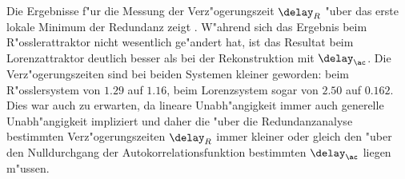 Die Ergebnisse f"ur die Messung der Verz"ogerungszeit $\delay_R$ "uber das erste lokale
Minimum der Redundanz zeigt . W"ahrend sich das Ergebnis beim
R"osslerattraktor nicht wesentlich ge"andert hat, ist das Resultat beim Lorenzattraktor
deutlich besser als bei der Rekonstruktion mit $\delay_\ac$. Die Verz"ogerungszeiten sind
bei beiden Systemen kleiner geworden: beim R"osslersystem von $1.29$ auf $1.16$, beim
Lorenzsystem sogar von $2.50$ auf $0.162$.  Dies war auch zu erwarten, da lineare
Unabh"angigkeit immer auch generelle Unabh"angigkeit impliziert und daher die "uber die
Redundanzanalyse bestimmten Verz"ogerungszeiten $\delay_R$ immer kleiner oder gleich den
"uber den Nulldurchgang der Autokorrelationsfunktion bestimmten $\delay_\ac$ liegen
m"ussen.


 






\newpage







